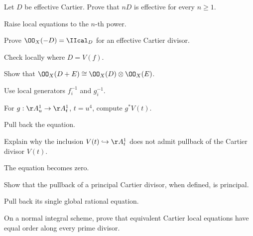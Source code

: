 \fi
\begin{exercise}\label{exr:vi40-06}
Let \(D\) be effective Cartier.  Prove that \(nD\) is effective for every \(n\ge1\).
\end{exercise}
\ifdefined\IncludeExerciseHints
\begin{hint}
Raise local equations to the \(n\)-th power.
\end{hint}
\fi
\begin{exercise}\label{exr:vi40-07}
Prove \(\OO_X(-D)=\IIcal_D\) for an effective Cartier divisor.
\end{exercise}
\ifdefined\IncludeExerciseHints
\begin{hint}
Check locally where \(D=V(f)\).
\end{hint}
\fi
\begin{exercise}\label{exr:vi40-08}
Show that \(\OO_X(D+E)\cong\OO_X(D)\otimes\OO_X(E)\).
\end{exercise}
\ifdefined\IncludeExerciseHints
\begin{hint}
Use local generators \(f_i^{-1}\) and \(g_i^{-1}\).
\end{hint}
\fi
\begin{exercise}\label{exr:vi40-09}
For \(g:\AA^1_u\to\AA^1_t\), \(t=u^4\), compute \(g^*V(t)\).
\end{exercise}
\ifdefined\IncludeExerciseHints
\begin{hint}
Pull back the equation.
\end{hint}
\fi
\begin{exercise}\label{exr:vi40-10}
Explain why the inclusion \(V(t)\hookrightarrow\AA^1_t\) does not admit pullback of the Cartier divisor \(V(t)\).
\end{exercise}
\ifdefined\IncludeExerciseHints
\begin{hint}
The equation becomes zero.
\end{hint}
\fi
\begin{exercise}\label{exr:vi40-11}
Show that the pullback of a principal Cartier divisor, when defined, is principal.
\end{exercise}
\ifdefined\IncludeExerciseHints
\begin{hint}
Pull back its single global rational equation.
\end{hint}
\fi
\begin{exercise}\label{exr:vi40-12}
On a normal integral scheme, prove that equivalent Cartier local equations have equal order along every prime divisor.
\end{exercise}
